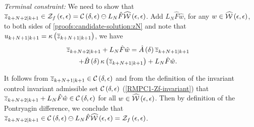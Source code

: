\noindent\textit{Terminal constraint:}
%
We need to show that $\overline{z}_{k+N+2| k+1}\in\mathcal{Z}_{f}\left(\epsilon,\epsilon\right)=\mathcal{C}\left(\delta,\epsilon\right)\ominus L_{N}\hat{F}\widehat{\mathcal{W}}\left(\epsilon,\epsilon\right)$.
Add $L_{N}\hat{F}\hat{w}$, for any $w\in\widehat{\mathcal{W}}\left(\epsilon,\epsilon\right)$,
to both sides of \eqref{proofs:candidate-solution:zN} and note that
$u_{k+N+1| k+1}=\kappa\left(\overline{z}_{k+N+1| k+1}\right)$,
we have 
\begin{multline*}
  \overline{z}_{k+N+2|
    k+1}+L_{N}\hat{F}\hat{w}=\hat{A}\left(\delta\right)\overline{z}_{k+N+1| k+1} \\
  +\hat{B}\left(\delta\right)\kappa\left(\overline{z}_{k+N+1| k+1}\right)+L_{N}\hat{F}\hat{w}\text{.}
\end{multline*}


 It follows from $\overline{z}_{k+N+1| k+1}\in\mathcal{C}\left(\delta,\epsilon\right)$
and from the definition of the invariant control invariant admissible
set $\mathcal{C}\left(\delta,\epsilon\right)$ (\eqref{RMPC1-Zf-invariant})
that $\overline{z}_{k+N+2| k+1}+L_{N}\hat{F}\hat{w}\in\mathcal{C}\left(\delta,\epsilon\right)$
for all $w\in\widehat{\mathcal{W}}\left(\epsilon,\epsilon\right)$. Then by definition
of the Pontryagin difference, we conclude that $\overline{z}_{k+N+2| k+1}\in\mathcal{C}\left(\delta,\epsilon\right)\ominus L_{N}\hat{F}\widehat{\mathcal{W}}\left(\epsilon,\epsilon\right)=\mathcal{Z}_{f}\left(\epsilon,\epsilon\right)$.


